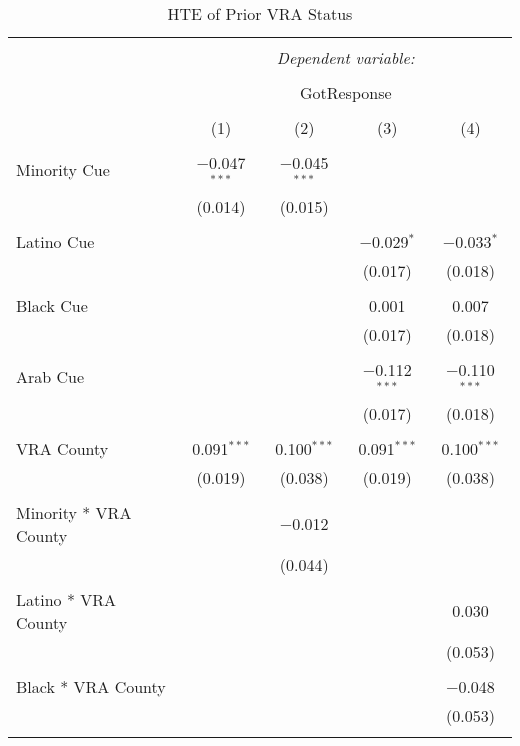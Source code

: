 
\begin{table}[!htbp] \centering 
  \caption{HTE of Prior VRA Status} 
  \label{tab:vraTable} 
\begin{tabular}{@{\extracolsep{5pt}}lcccc} 
\\[-1.8ex]\hline 
\hline \\[-1.8ex] 
 & \multicolumn{4}{c}{\textit{Dependent variable:}} \\ 
\cline{2-5} 
\\[-1.8ex] & \multicolumn{4}{c}{GotResponse} \\ 
\\[-1.8ex] & (1) & (2) & (3) & (4)\\ 
\hline \\[-1.8ex] 
 Minority Cue & $-$0.047$^{***}$ & $-$0.045$^{***}$ &  &  \\ 
  & (0.014) & (0.015) &  &  \\ 
  & & & & \\ 
 Latino Cue &  &  & $-$0.029$^{*}$ & $-$0.033$^{*}$ \\ 
  &  &  & (0.017) & (0.018) \\ 
  & & & & \\ 
 Black Cue &  &  & 0.001 & 0.007 \\ 
  &  &  & (0.017) & (0.018) \\ 
  & & & & \\ 
 Arab Cue &  &  & $-$0.112$^{***}$ & $-$0.110$^{***}$ \\ 
  &  &  & (0.017) & (0.018) \\ 
  & & & & \\ 
 VRA County & 0.091$^{***}$ & 0.100$^{***}$ & 0.091$^{***}$ & 0.100$^{***}$ \\ 
  & (0.019) & (0.038) & (0.019) & (0.038) \\ 
  & & & & \\ 
 Minority * VRA County &  & $-$0.012 &  &  \\ 
  &  & (0.044) &  &  \\ 
  & & & & \\ 
 Latino * VRA County &  &  &  & 0.030 \\ 
  &  &  &  & (0.053) \\ 
  & & & & \\ 
 Black * VRA County &  &  &  & $-$0.048 \\ 
  &  &  &  & (0.053) \\ 
  & & & & \\ 

\end{tabular}
\end{table}
